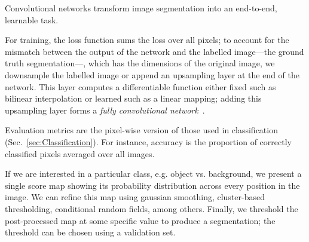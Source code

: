 Convolutional networks transform image segmentation into an end-to-end, learnable task.

For training, the loss function sums the loss over all pixels; to account for the mismatch between the output of the network and the labelled image---the ground truth segmentation---, which has the dimensions of the original image, we downsample the labelled image or append an upsampling layer at the end of the network. This layer computes a differentiable function either fixed such as bilinear interpolation or learned such as a linear mapping; adding this upsampling layer forms a \emph{fully convolutional network}~\cite{Long2015}.

Evaluation metrics are the pixel-wise version of those used in classification (Sec.~\ref{sec:Classification}). For instance, accuracy is the proportion of correctly classified pixels averaged over all images.

If we are interested in a particular class, e.g. object vs. background, we present a single score map showing its probability distribution across every position in the image. We can refine this map using gaussian smoothing, cluster-based thresholding, conditional random fields, among others. Finally, we threshold the post-processed map at some specific value to produce a segmentation; the threshold can be chosen using a validation set.
